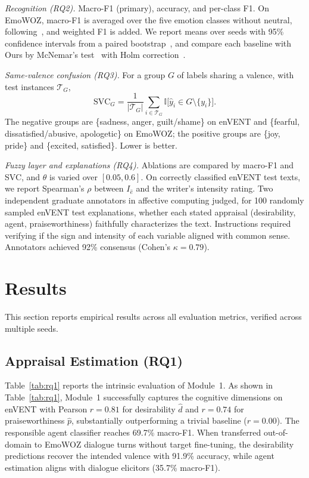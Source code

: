 \documentclass[conference, a4paper]{IEEEtran}
\begin{document}
\textit{Recognition (RQ2).} Macro-F1 (primary), accuracy, and per-class F1. On EmoWOZ, macro-F1 is averaged over the five emotion classes without neutral, following~\cite{feng2022emowoz}, and weighted F1 is added. We report means over seeds with 95\% confidence intervals from a paired bootstrap~\cite{efron1993introduction}, and compare each baseline with Ours by McNemar's test~\cite{mcnemar1947note} with Holm correction~\cite{holm1979simple}.

\textit{Same-valence confusion (RQ3).} For a group $G$ of labels sharing a valence, with test instances $\mathcal{T}_G$,
\begin{equation}
    \mathrm{SVC}_G = \frac{1}{|\mathcal{T}_G|} \sum_{i \in \mathcal{T}_G} \mathbb{I}\big[\hat y_i \in G \setminus \{y_i\}\big].
\end{equation}
The negative groups are \{sadness, anger, guilt/shame\} on enVENT and \{fearful, dissatisfied/abusive, apologetic\} on EmoWOZ; the positive groups are \{joy, pride\} and \{excited, satisfied\}. Lower is better.

\textit{Fuzzy layer and explanations (RQ4).} Ablations are compared by macro-F1 and SVC, and $\theta$ is varied over $[0.05, 0.6]$. On correctly classified enVENT test texts, we report Spearman's $\rho$ between $I_{\hat e}$ and the writer's intensity rating. Two independent graduate annotators in affective computing judged, for 100 randomly sampled enVENT test explanations, whether each stated appraisal (desirability, agent, praiseworthiness) faithfully characterizes the text. Instructions required verifying if the sign and intensity of each variable aligned with common sense. Annotators achieved 92\% consensus (Cohen's $\kappa = 0.79$).

\section{Results}
\label{sec:results}
This section reports empirical results across all evaluation metrics, verified across multiple seeds.

\subsection{Appraisal Estimation (RQ1)}
Table~\ref{tab:rq1} reports the intrinsic evaluation of Module~1. As shown in Table~\ref{tab:rq1}, Module~1 successfully captures the cognitive dimensions on enVENT with Pearson $r = 0.81$ for desirability $\hat d$ and $r = 0.74$ for praiseworthiness $\hat p$, substantially outperforming a trivial baseline ($r = 0.00$). The responsible agent classifier reaches 69.7\% macro-F1. When transferred out-of-domain to EmoWOZ dialogue turns without target fine-tuning, the desirability predictions recover the intended valence with 91.9\% accuracy, while agent estimation aligns with dialogue elicitors (35.7\% macro-F1).
\end{document}
